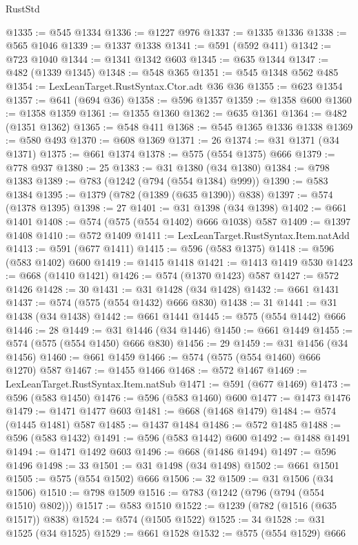 \begin{lexlean}{RustStd}
\begin{coremodule}
@1335 := @545 @1334
@1336 := @1227 @976
@1337 := @1335 @1336
@1338 := @565 @1046
@1339 := @1337 @1338
@1341 := @591 (@592 @411)
@1342 := @723 @1040
@1344 := @1341 @1342 @603
@1345 := @635 @1344
@1347 := @482 (@1339 @1345)
@1348 := @548 @365
@1351 := @545 @1348 @562 @485
@1354 := LexLeanTarget.RustSyntax.Ctor.adt @36 @36
@1355 := @623 @1354
@1357 := @641 (@694 @36)
@1358 := @596 @1357
@1359 := @1358 @600
@1360 := @1358 @1359
@1361 := @1355 @1360
@1362 := @635 @1361
@1364 := @482 (@1351 @1362)
@1365 := @548 @411
@1368 := @545 @1365 @1336 @1338
@1369 := @580 @493
@1370 := @608 @1369
@1371 := 26
@1374 := @31 @1371 (@34 @1371)
@1375 := @661 @1374
@1378 := @575 (@554 @1375) @666
@1379 := @778 @937
@1380 := 25
@1383 := @31 @1380 (@34 @1380)
@1384 := @798 @1383
@1389 := @783 (@1242 (@794 (@554 @1384) @999))
@1390 := @583 @1384
@1395 := @1379 (@782 (@1389 (@635 @1390)) @838)
@1397 := @574 (@1378 @1395)
@1398 := 27
@1401 := @31 @1398 (@34 @1398)
@1402 := @661 @1401
@1408 := @574 (@575 (@554 @1402) @666 @1038) @587
@1409 := @1397 @1408
@1410 := @572 @1409
@1411 := LexLeanTarget.RustSyntax.Item.natAdd
@1413 := @591 (@677 @1411)
@1415 := @596 (@583 @1375)
@1418 := @596 (@583 @1402) @600
@1419 := @1415 @1418
@1421 := @1413 @1419 @530
@1423 := @668 (@1410 @1421)
@1426 := @574 (@1370 @1423) @587
@1427 := @572 @1426
@1428 := 30
@1431 := @31 @1428 (@34 @1428)
@1432 := @661 @1431
@1437 := @574 (@575 (@554 @1432) @666 @830)
@1438 := 31
@1441 := @31 @1438 (@34 @1438)
@1442 := @661 @1441
@1445 := @575 (@554 @1442) @666
@1446 := 28
@1449 := @31 @1446 (@34 @1446)
@1450 := @661 @1449
@1455 := @574 (@575 (@554 @1450) @666 @830)
@1456 := 29
@1459 := @31 @1456 (@34 @1456)
@1460 := @661 @1459
@1466 := @574 (@575 (@554 @1460) @666 @1270) @587
@1467 := @1455 @1466
@1468 := @572 @1467
@1469 := LexLeanTarget.RustSyntax.Item.natSub
@1471 := @591 (@677 @1469)
@1473 := @596 (@583 @1450)
@1476 := @596 (@583 @1460) @600
@1477 := @1473 @1476
@1479 := @1471 @1477 @603
@1481 := @668 (@1468 @1479)
@1484 := @574 (@1445 @1481) @587
@1485 := @1437 @1484
@1486 := @572 @1485
@1488 := @596 (@583 @1432)
@1491 := @596 (@583 @1442) @600
@1492 := @1488 @1491
@1494 := @1471 @1492 @603
@1496 := @668 (@1486 @1494)
@1497 := @596 @1496
@1498 := 33
@1501 := @31 @1498 (@34 @1498)
@1502 := @661 @1501
@1505 := @575 (@554 @1502) @666
@1506 := 32
@1509 := @31 @1506 (@34 @1506)
@1510 := @798 @1509
@1516 := @783 (@1242 (@796 (@794 (@554 @1510) @802)))
@1517 := @583 @1510
@1522 := @1239 (@782 (@1516 (@635 @1517)) @838)
@1524 := @574 (@1505 @1522)
@1525 := 34
@1528 := @31 @1525 (@34 @1525)
@1529 := @661 @1528
@1532 := @575 (@554 @1529) @666

\end{coremodule}
\end{lexlean}
